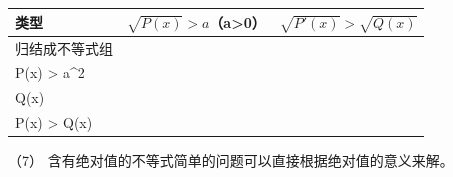 {\def\LTcaptype{none} %
\begin{longtable}[]{@{}
  >{\raggedright\arraybackslash}p{}
  >{\raggedright\arraybackslash}p{}
  >{\raggedright\arraybackslash}p{}@{}}
\toprule\noalign{}
\begin{minipage}[b]{\linewidth}\raggedright
类型
\end{minipage} & \begin{minipage}[b]{\linewidth}\raggedright
\(\sqrt{P(x)} >a\)（a\textgreater0）
\end{minipage} & \begin{minipage}[b]{\linewidth}\raggedright
\(\sqrt{P'(x)} >\sqrt{Q(x)}\)
\end{minipage} \\
\midrule\noalign{}
\endhead
\bottomrule\noalign{}
\endlastfoot
归结成不等式组 & \(\begin{cases} P(x) \geq 0 \\ P(x) > a^2 \end{cases}\)
&
\(\begin{cases} P(x) \geq 0 \\ Q(x) \geq 0 \\ P(x) > Q(x) \end{cases}\) \\
\end{longtable}
}

（7） 含有绝对值的不等式简单的问题可以直接根据绝对值的意义来解。

